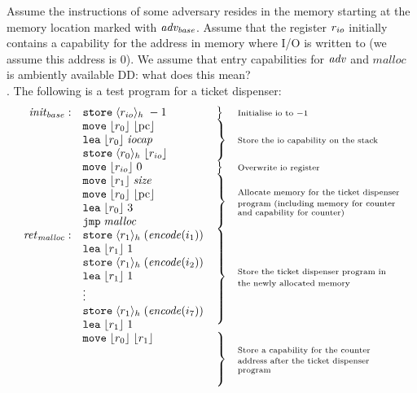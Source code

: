 \documentclass{article}
\newcommand\dominique[1]{{\color{purple} \sf \footnotesize {DD: #1}}\\}
\newcommand{\pcreg}{\mathrm{pc}}
\newcommand{\plainfun}[2]{
  \ifthenelse{\equal{#2}{}}
             {\mathit{#1}}
             {\mathit{#1}(#2)}
}
\newcommand{\encode}{\plainfun{encode}{}}
\newcommand{\codelabel}[1]{\mathit{#1}}
\newcommand{\malloc}{\codelabel{malloc}}
\newcommand{\iocap}{\codelabel{iocap}}
\newcommand{\refreg}[1]{\lfloor #1 \rfloor}
\newcommand{\refheap}[1]{\langle #1 \rangle_h}
\newcommand{\zinstr}[1]{\mathtt{#1}}
\newcommand{\oneinstr}[2]{\zinstr{#1} \; #2}
\newcommand{\jmp}[1]{\oneinstr{jmp}{#1}}
\newcommand{\twoinstr}[3]{\zinstr{#1} \; #2 \; #3}
\newcommand{\move}[2]{\twoinstr{move}{#1}{#2}}
\newcommand{\store}[2]{\twoinstr{store}{#1}{#2}}
\newcommand{\lea}[2]{\twoinstr{lea}{#1}{#2}}
\begin{document}
Assume the instructions of some adversary resides in the memory starting at the memory location marked with $\mathit{adv_{base}}$. Assume that the register $r_{io}$ initially contains a capability for the address in memory where I/O is written to (we assume this address is 0). We assume that entry capabilities for $\adv$ and $\malloc$ is ambiently available\dominique{what does this mean?}. The following is a test program for a ticket dispenser:
\[
  \begin{array}{r l l p{\mrlen}}
\initb:     & \store{\refheap{\rio}}{-1} & \bracket{1} & \annotate{1}{Initialise io to $-1$} \\
           & \move{\refreg{r_0}}{\refreg{\pcreg}} & \bracket{3} & \annotate{3}{Store the io capability on the stack} \\
           & \lea{\refreg{r_0}}{\iocap} & & \\
           & \store{\refheap{r_0}}{\refreg{\rio}} & & \\
           & \move{\refreg{\rio}}{0} & \bracket{1} & \annotate{1}{Overwrite io register} \\
           & \move{\refreg{r_1}}{\size} &  \bracket{4} & \annotate{4}{Allocate memory for the ticket dispenser program (including memory for counter and capability for counter)}\\
           & \move{\refreg{r_0}}{\refreg{\pcreg}} & & \\
           & \lea{\refreg{r_0}}{3} & & \\
           & \jmp{\malloc} & & \\
\retm:     & \store{\refheap{r_1}}{(\encode(i_1))} & \bracket{7} & \annotate{7}{Store the ticket dispenser program in the newly allocated memory} \\
           & \lea{\refreg{r_1}}{1} & & \\
           & \store{\refheap{r_1}}{(\encode(i_2))} & & \\
           & \lea{\refreg{r_1}}{1} & & \\
           & \vdots & & \\
           & \store{\refheap{r_1}}{(\encode(i_7))} & & \\
           & \lea{\refreg{r_1}}{1} & & \\
           & \move{\refreg{r_0}}{\refreg{r_1}} & \bracket{4} & \annotate{4}{Store a capability for the counter address after the ticket dispenser program} \\

\end{array}\]
\end{document}
